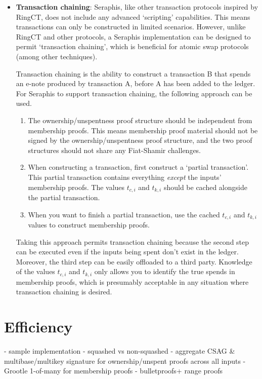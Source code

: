 \begin{itemize}
    \item \textbf{Transaction chaining}: Seraphis, like other transaction protocols inspired by RingCT, does not include any advanced `scripting' capabilities. This means transactions can only be constructed in limited scenarios. However, unlike RingCT and other protocols, a Seraphis implementation can be designed to permit `transaction chaining', which is beneficial for atomic swap protocols \cite{atomic-swaps-paper} (among other techniques).

    Transaction chaining is the ability to construct a transaction B that spends an e-note produced by transaction A, before A has been added to the ledger. For Seraphis to support transaction chaining, the following approach can be used.

    \begin{enumerate}
        \item The ownership/unspentness proof structure should be independent from membership proofs. This means membership proof material should not be signed by the ownership/unspentness proof structure, and the two proof structures should not share any Fiat-Shamir challenges.

        \item When constructing a transaction, first construct a `partial transaction'. This partial transaction contains everything {\em except} the inputs' membership proofs. The values $t_{c,i}$ and $t_{k,i}$ should be cached alongside the partial transaction.

        \item When you want to finish a partial transaction, use the cached $t_{c,i}$ and $t_{k,i}$ values to construct membership proofs.
    \end{enumerate}

    Taking this approach permits transaction chaining because the second step can be executed even if the inputs being spent don't exist in the ledger. Moreover, the third step can be easily offloaded to a third party. Knowledge of the values $t_{c,i}$ and $t_{k,i}$ only allows you to identify the true spends in membership proofs, which is presumably acceptable in any situation where transaction chaining is desired.
\end{itemize}



\section{Efficiency}
\label{sec:efficiency}

- sample implementation
    - squashed vs non-squashed
    - aggregate CSAG \& multibase/multikey signature for ownership/unspent proofs across all inputs
    - Grootle 1-of-many for membership proofs
    - bulletproofs+ range proofs
